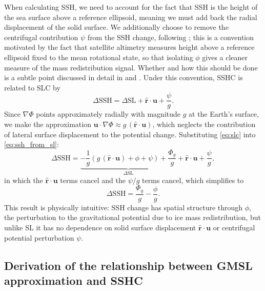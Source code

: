 When calculating SSH, we need to account for the fact that SSH is the
height of the sea surface above a reference ellipsoid, meaning we must
add back the radial displacement of the solid surface. We additionally
choose to remove the centrifugal contribution $\psi$ from the SSH change,
following \textcite{al-attarReciprocitySensitivityKernels2023}; this is a convention motivated by the fact
that satellite altimetry measures height above a reference ellipsoid fixed
to the mean rotational state, so that isolating $\phi$ gives a cleaner
measure of the mass redistribution signal. Whether and how this should be
done is a subtle point discussed in detail in \textcite{tamisieaOngoingGlacialIsostatic2011} and
\textcite{lickleyBiasEstimatesGlobal2018}. Under this convention, SSHC is related to
SLC by
%
\begin{equation}
    \Delta\mathrm{SSH} = \Delta\mathrm{SL}
        + \hat{\mathbf{r}} \cdot \mathbf{u}
        + \frac{\psi}{g}.
    \label{eq:ssh_from_sl}
\end{equation}
%
Since $\nabla\Phi$ points approximately radially with magnitude $g$ at the
Earth's surface, we make the approximation
$\mathbf{u} \cdot \nabla\Phi \approx g\,\left(\hat{\mathbf{r}} \cdot \mathbf{u}\right)$,
which neglects the contribution of lateral surface displacement to the
potential change. Substituting \autoref{eq:slc} into \autoref{eq:ssh_from_sl}:
%
\begin{equation}
    \Delta\mathrm{SSH} =
    \underbrace{
        -\frac{1}{g}\!\left(
            g\,\left(\hat{\mathbf{r}} \cdot \mathbf{u}\right) + \phi + \psi
        \right)
        + \frac{\Phi_g}{g}
    }_{\Delta\mathrm{SL}}
    + \hat{\mathbf{r}} \cdot \mathbf{u}
    + \frac{\psi}{g},
    \label{eq:ssh_expanded}
\end{equation}
%
in which the $\hat{\mathbf{r}} \cdot \mathbf{u}$ terms cancel and the
$\psi/g$ terms cancel, which simplifies to
%
\begin{equation}
    \Delta\mathrm{SSH} = \frac{\Phi_g}{g} - \frac{\phi}{g}.
    \label{eq:sshc}
\end{equation}
%
This result is physically intuitive: SSH change has spatial structure
through $\phi$, the perturbation to the gravitational potential due to
ice mass redistribution, but unlike SL it has no dependence on solid
surface displacement $\hat{\mathbf{r}} \cdot \mathbf{u}$ or centrifugal
potential perturbation $\psi$.

\subsection{Derivation of the relationship between GMSL approximation and SSHC}\label{sec:point_gmsl_derivation}

